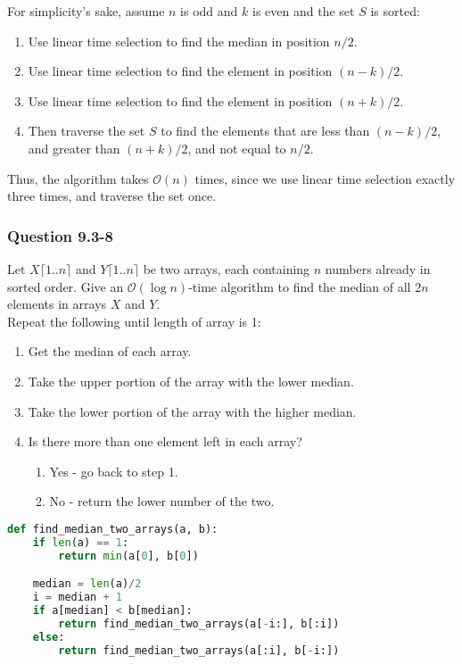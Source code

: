 \documentclass[11pt]{article}
\begin{document}
For simplicity's sake, assume $n$ is odd and $k$ is even and the set $S$ is sorted:
\begin{enumerate}
\item Use linear time selection to find the median in position $n/2$.
\item Use linear time selection to find the element in position $(n-k)/2$.
\item Use linear time selection to find the element in position $(n+k)/2$.
\item Then traverse the set $S$ to find the elements that are less than $(n-k)/2$, and greater than $(n+k)/2$, and not equal to $n/2$.
\end{enumerate}
Thus, the algorithm takes $\mathcal{O}(n)$ times, since we use linear time selection exactly three times, and traverse the set once.\\

\subsubsection*{Question 9.3-8}\nointerlineskip
Let $X \lceil 1 ..n \rceil$ and $Y \lceil 1 ..n \rceil$ be two arrays, each containing $n$ numbers already in sorted order. Give an $\mathcal{O}(\log n)$-time algorithm to find the median of all 2$n$ elements in arrays $X$ and $Y$.\\


Repeat the following until length of array is 1:
\begin{enumerate}
\item Get the median of each array.
\item Take the upper portion of the array with the lower median.
\item Take the lower portion of the array with the higher median.
\item Is there more than one element left in each array?
\begin{enumerate}
\item Yes - go back to step 1.
\item No - return the lower number of the two.\\
\end{enumerate}
\end{enumerate}

\begin{center}  
\begin{minipage}{5in}
\begin{lstlisting}[language=Python]
def find_median_two_arrays(a, b):
    if len(a) == 1:
        return min(a[0], b[0])

    median = len(a)/2
    i = median + 1
    if a[median] < b[median]:
        return find_median_two_arrays(a[-i:], b[:i])
    else:
        return find_median_two_arrays(a[:i], b[-i:])
        
\end{lstlisting}
\end{minipage}
\end{center}

\vspace{20pt}
\end{document}
